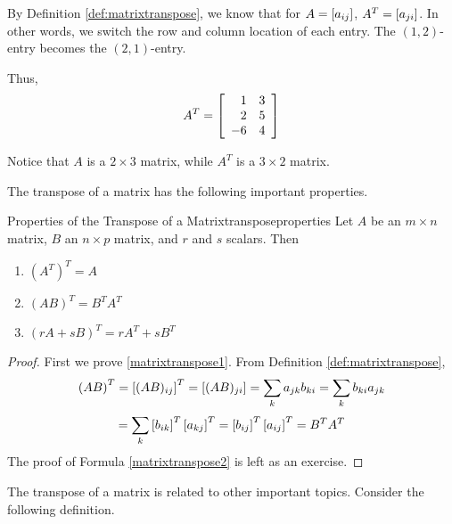 \begin{solution}
By Definition \ref{def:matrixtranspose}, we know that for $A = \left[ a_{ij} \right]$, 
$A^T = \left[ a_{ji} \right]$. In other words, we switch the row and column
location of each entry. The $\left( 1, 2 \right)$-entry becomes the $\left( 2,1 \right)$-entry.

Thus, 
\begin{equation*}
A^T = 
 \left[
\begin{array}{rr}
1 & 3 \\
2 & 5 \\
-6 & 4
\end{array}
\right] 
\end{equation*}

Notice that $A$ is a $2 \times 3$ matrix, while $A^T$ is a $3 \times 2$ matrix. 
\end{solution}

The transpose of a matrix has the following important properties.

\begin{lemma}{Properties of the Transpose of a Matrix}{transposeproperties}
Let $A$ be an $m\times n$ matrix, $B$ an $n\times p$ matrix, and $r$ and $s$ scalars. Then
\begin{enumerate}
\item
$\left(A^{T}\right)^{T} = A$
\item
$\left( AB\right) ^{T}=B^{T}A^{T} $ \label{matrixtranspose1}
\item
$\left( rA+ sB\right) ^{T}=rA^{T}+ sB^{T}$  \label{matrixtranspose2}
\end{enumerate}
\end{lemma}

\begin{proof}
First we prove \ref{matrixtranspose1}. From Definition \ref{def:matrixtranspose},
\begin{equation*}
\left(AB\right)^{T} = \left[ (AB) _{ij} \right] ^{T}=\left[ (AB)_{ji} \right]=\sum_{k}a_{jk}b_{ki}= \sum_{k}b_{ki}a_{jk} 
\end{equation*}
\begin{equation*}
= \sum_{k}\left[ b_{ik}\right]^{T}\left[
a_{kj}\right]^{T}=\left[ b_{ij}\right] ^{T} \left[ a_{ij}\right]^{T} = B^{T}A^{T} 
\end{equation*}
The proof of Formula \ref{matrixtranspose2} is left as an exercise. 
\end{proof}

The transpose of a matrix is related to other important topics. Consider the following definition.  


